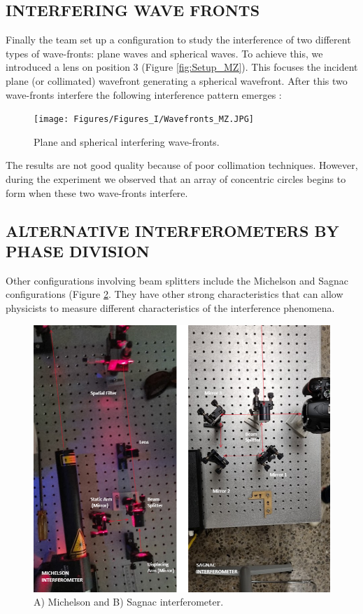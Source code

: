 \subsection{INTERFERING WAVE FRONTS}
Finally the team set up a configuration to study the interference of two different types of wave-fronts: plane waves and spherical waves. To achieve this, we introduced a lens on position 3 (Figure \ref{fig:Setup_MZ}). This focuses the incident plane (or collimated) wavefront generating a spherical wavefront. After this two wave-fronts interfere the following interference pattern emerges \cite{fig:Wavefronts}: 
\begin{figure}[H]
    \centering
    \texttt{[image: Figures/Figures\_I/Wavefronts\_MZ.JPG]}
    \caption{Plane and spherical interfering wave-fronts.}
    \label{fig:Wavefronts}
\end{figure}
The results are not good quality because of poor collimation techniques. However, during the experiment we observed that an array of concentric circles begins to form when these two wave-fronts interfere. 

\subsection{ALTERNATIVE INTERFEROMETERS BY PHASE DIVISION} 

Other configurations involving beam splitters include the Michelson and Sagnac configurations (Figure \ref{fig:MS}. They have other strong characteristics that can allow physicists to measure different characteristics of the interference phenomena. 

\begin{figure}[H]
    \centering
    \includegraphics[scale=0.33]{Figures/Figures_I/MichelsonSagnac.png}
    \caption{A) Michelson and B) Sagnac interferometer.}
    \label{fig:MS}
\end{figure}

